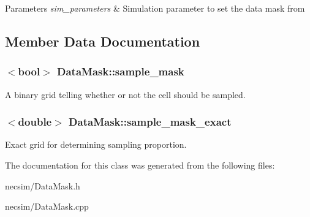 \begin{DoxyParams}{Parameters}
{\em sim\+\_\+parameters} & Simulation parameter to set the data mask from \\
\hline
\end{DoxyParams}


\subsection{Member Data Documentation}
\subsubsection[{\texorpdfstring{sample\+\_\+mask}{sample_mask}}]{$<$bool$>$ Data\+Mask\+::sample\+\_\+mask}\hypertarget{class_data_mask_a0ebe741d4b22824f93dacddd175d2c96}{}\label{class_data_mask_a0ebe741d4b22824f93dacddd175d2c96}
A binary grid telling whether or not the cell should be sampled. 
\subsubsection[{\texorpdfstring{sample\+\_\+mask\+\_\+exact}{sample_mask_exact}}]{$<$double$>$ Data\+Mask\+::sample\+\_\+mask\+\_\+exact}\hypertarget{class_data_mask_acc231ebddc3e5db0103220b20d968a4f}{}\label{class_data_mask_acc231ebddc3e5db0103220b20d968a4f}
Exact grid for determining sampling proportion. 

The documentation for this class was generated from the following files\+:\begin{DoxyCompactItemize}
\item 
necsim/Data\+Mask.\+h\item 
necsim/Data\+Mask.\+cpp\end{DoxyCompactItemize}
